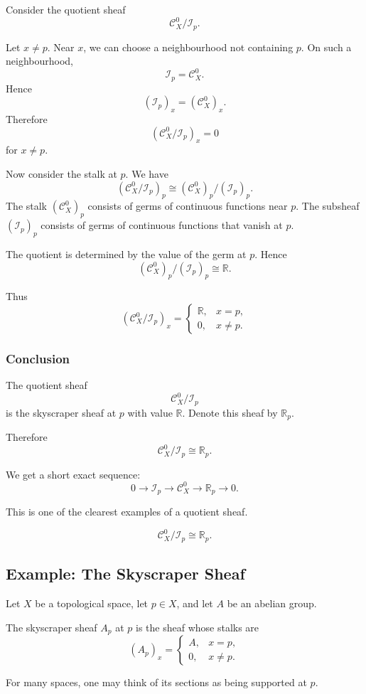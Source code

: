 \documentclass[12pt,a4paper]{article}
\newcommand{\RR}{\mathbb{R}}
\newcommand{\Czero}{\mathcal C^0}        %
\theoremstyle{notespace}
\begin{document}
Consider the quotient sheaf
\[
\Czero_X/\mathcal I_p.
\]

Let \(x\neq p\). Near \(x\), we can choose a neighbourhood not containing \(p\). On such a neighbourhood,
\[
\mathcal I_p=\Czero_X.
\]
Hence
\[
(\mathcal I_p)_x=(\Czero_X)_x.
\]
Therefore
\[
(\Czero_X/\mathcal I_p)_x=0
\]
for \(x\neq p\).

Now consider the stalk at \(p\). We have
\[
(\Czero_X/\mathcal I_p)_p
\cong
(\Czero_X)_p/(\mathcal I_p)_p.
\]
The stalk \((\Czero_X)_p\) consists of germs of continuous functions near \(p\). The subsheaf \((\mathcal I_p)_p\) consists of germs of continuous functions that vanish at \(p\).

The quotient is determined by the value of the germ at \(p\). Hence
\[
(\Czero_X)_p/(\mathcal I_p)_p\cong \RR.
\]

Thus
\[
(\Czero_X/\mathcal I_p)_x
=
\begin{cases}
	\RR, & x=p,\\
	0, & x\neq p.
\end{cases}
\]

\subsubsection*{Conclusion}

The quotient sheaf
\[
\Czero_X/\mathcal I_p
\]
is the skyscraper sheaf at \(p\) with value \(\RR\). Denote this sheaf by \(\RR_p\).

Therefore
\[
\Czero_X/\mathcal I_p\cong \RR_p.
\]

We get a short exact sequence:
\[
0\to \mathcal I_p
\to \Czero_X
\to \RR_p
\to 0.
\]

This is one of the clearest examples of a quotient sheaf.

\[
\boxed{
	\Czero_X/\mathcal I_p\cong \RR_p.
}
\]

\subsection{Example: The Skyscraper Sheaf}

Let \(X\) be a topological space, let \(p\in X\), and let \(A\) be an abelian group.

The skyscraper sheaf \(A_p\) at \(p\) is the sheaf whose stalks are
\[
(A_p)_x=
\begin{cases}
	A, & x=p,\\
	0, & x\neq p.
\end{cases}
\]

For many spaces, one may think of its sections as being supported at \(p\).
\end{document}
